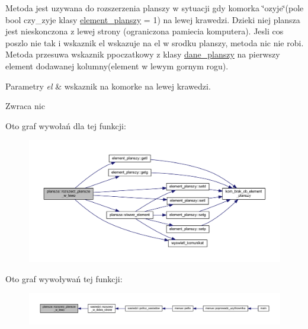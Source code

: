 Metoda jest uzywana do rozszerzenia planszy w sytuacji gdy komorka \char`\"{}ozyje\char`\"{}(pole bool czy\+\_\+zyje klasy \mbox{\hyperlink{classelement__planszy}{element\+\_\+planszy}} = 1) na lewej krawedzi. Dzieki niej plansza jest nieskonczona z lewej strony (ograniczona pamiecia komputera). Jesli cos poszlo nie tak i wskaznik el wskazuje na el w srodku planszy, metoda nic nie robi. Metoda przesuwa wskaznik ppoczatkowy z klasy \mbox{\hyperlink{classdane__planszy}{dane\+\_\+planszy}} na pierwszy element dodawanej kolumny(element w lewym gornym rogu). 
\begin{DoxyParams}{Parametry}
{\em el} & wskaznik na komorke na lewej krawedzi. \\
\hline
\end{DoxyParams}
\begin{DoxyReturn}{Zwraca}
nic 
\end{DoxyReturn}
Oto graf wywołań dla tej funkcji\+:
\nopagebreak
\begin{figure}[H]
\begin{center}
\leavevmode
\includegraphics[width=350pt]{classplansza_aed692a9ce528a20a6e431d84cdb58f6b_cgraph}
\end{center}
\end{figure}
Oto graf wywoływań tej funkcji\+:
\nopagebreak
\begin{figure}[H]
\begin{center}
\leavevmode
\includegraphics[width=350pt]{classplansza_aed692a9ce528a20a6e431d84cdb58f6b_icgraph}
\end{center}
\end{figure}
\mbox{\label{classplansza_a50024fced2d5f43220cee76e77e54882}} 
